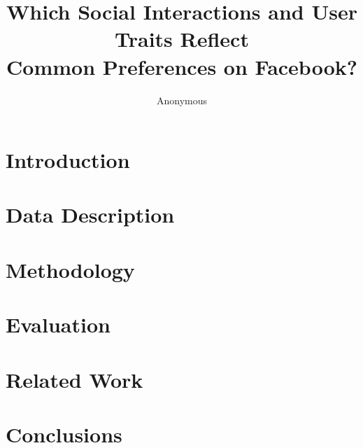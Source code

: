 \documentclass[letterpaper]{article}
\begin{document}
%
\title{Which Social Interactions and User Traits Reflect \\Common Preferences on Facebook?}
\author{Anonymous}

\begin{abstract}
\end{abstract}

\section{Introduction}

%

\section{Data Description}



\section{Methodology}

%

\section{Evaluation}



\section{Related Work}

%

\section{Conclusions}

%

%

\end{document}
